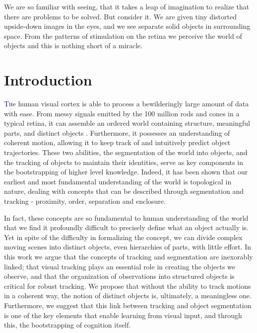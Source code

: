 \begin{savequote}[75mm]
We are so familiar with seeing, that it takes a leap of imagination to realize that there are problems to be solved. But consider it. We are given tiny distorted upside-down images in the eyes, and we see separate solid objects in surrounding space. From the patterns of stimulation on the retina we perceive the world of objects and this is nothing short of a miracle.
\end{savequote}



\chapter{Introduction}
\lettrine[lines=3, loversize=0.3]{\textcolor{DarkBlue}T}he human visual cortex is able to process a bewilderingly large amount of data with ease. From messy signals emitted by the 100 million rods and cones in a typical retina, it can assemble an ordered world containing structure, meaningful parts, and distinct objects \cite{kandel2000principles}. Furthermore, it possesses an understanding of coherent motion, allowing it to keep track of and intuitively predict object trajectories. These two abilities, the segmentation of the world into objects, and the tracking of objects to maintain their identities, serve as key components in the bootstrapping of higher level knowledge. Indeed, it has been shown that our earliest and most fundamental understanding of the world is topological in nature, dealing with concepts that can be described through segmentation and tracking - proximity, order, separation and enclosure\cite{piaget1967}.

In fact, these concepts are so fundamental to human understanding of the world that we find it profoundly difficult to precisely define what an object actually is. Yet in spite of the difficulty in formalizing the concept, we can divide complex moving scenes into distinct objects, even hierarchies of parts, with little effort. In this work we argue that the concepts of tracking and segmentation are inexorably linked; that visual tracking plays an essential role in creating the objects we observe, and that the organization of observations into structured objects is critical for robust tracking. We propose that without the ability to track motions in a coherent way, the notion of distinct objects is, ultimately, a meaningless one. Furthermore, we suggest that this link between tracking and object segmentation is one of the key elements that enable learning from visual input, and through this, the bootstrapping of cognition itself.

